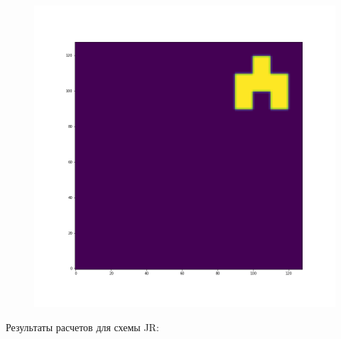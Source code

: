 \documentclass[12pt,a4paper]{article}
\begin{document}
\begin{figure}[H]
\begin{minipage}{.3\textwidth}
\end{minipage}%
\begin{minipage}{.3\textwidth}
  \centering
  \includegraphics[width=\linewidth]{Pictures/Solve2DWhiteBearMovementTestTHINC/Solve2DWhiteBearMovementTest_t50.png}
\end{minipage}
\end{figure}

Результаты расчетов для схемы JR:
\end{document}
